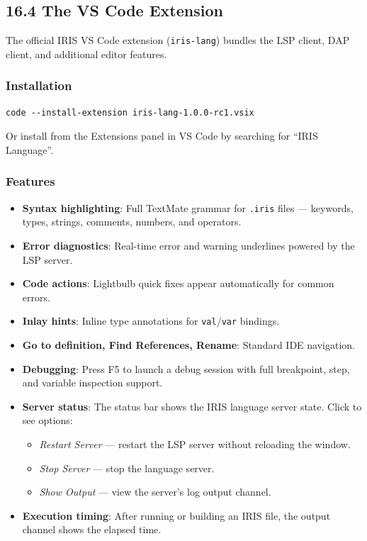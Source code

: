\documentclass[
  english,
]{book}
\providecommand{\tightlist}{%
  \setlength{\itemsep}{0pt}\setlength{\parskip}{0pt}}
\begin{document}
\subsection{16.4 The VS Code Extension}\label{the-vs-code-extension}

The official IRIS VS Code extension (\texttt{iris-lang}) bundles the LSP
client, DAP client, and additional editor features.

\subsubsection{Installation}\label{installation-1}

\begin{verbatim}
code --install-extension iris-lang-1.0.0-rc1.vsix
\end{verbatim}

Or install from the Extensions panel in VS Code by searching for ``IRIS
Language''.

\subsubsection{Features}\label{features}

\begin{itemize}
\tightlist
\item
  \textbf{Syntax highlighting}: Full TextMate grammar for \texttt{.iris}
  files --- keywords, types, strings, comments, numbers, and operators.
\item
  \textbf{Error diagnostics}: Real-time error and warning underlines
  powered by the LSP server.
\item
  \textbf{Code actions}: Lightbulb quick fixes appear automatically for
  common errors.
\item
  \textbf{Inlay hints}: Inline type annotations for
  \texttt{val}/\texttt{var} bindings.
\item
  \textbf{Go to definition, Find References, Rename}: Standard IDE
  navigation.
\item
  \textbf{Debugging}: Press F5 to launch a debug session with full
  breakpoint, step, and variable inspection support.
\item
  \textbf{Server status}: The status bar shows the IRIS language server
  state. Click to see options:

  \begin{itemize}
  \tightlist
  \item
    \emph{Restart Server} --- restart the LSP server without reloading
    the window.
  \item
    \emph{Stop Server} --- stop the language server.
  \item
    \emph{Show Output} --- view the server's log output channel.
  \end{itemize}
\item
  \textbf{Execution timing}: After running or building an IRIS file, the
  output channel shows the elapsed time.
\end{itemize}
\end{document}
